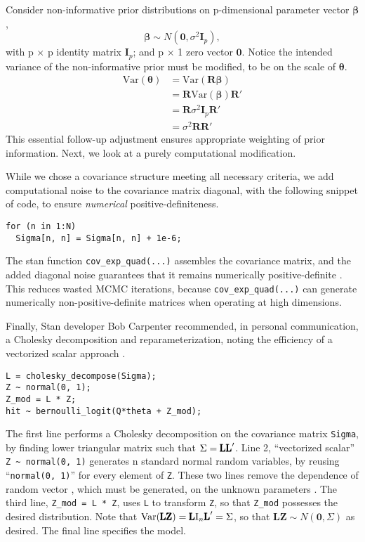 Consider non-informative prior distributions on p-dimensional parameter vector $\pmb{\beta}$,
\begin{equation}
\pmb{\beta} \sim N(\pmb{0}, \sigma^{2}\pmb{I}_{p}), 
\end{equation}
with p $\times$ p identity matrix $\pmb{I}_{p}$; and p $\times$ 1 zero vector $\pmb{0}$. Notice the intended variance of the non-informative prior must be modified, to be on the scale of $\pmb{\theta}$.
\begin{align}
\text{Var}(\pmb{\theta}) &= \text{Var}(\pmb{R \beta}) \\
&= \pmb{R}\text{Var}(\pmb{\beta})\pmb{R}' \\
&= \pmb{R}\sigma^{2}\pmb{I}_{p}\pmb{R}' \\
&= \sigma^{2} \pmb{R}\pmb{R}'
\end{align}
This essential follow-up adjustment ensures appropriate weighting of prior information. Next, we look at a purely computational modification.

While we chose a covariance structure meeting all necessary criteria, we add computational noise to the covariance matrix diagonal, with the following snippet of code, to ensure {\it numerical} positive-definiteness.
\begin{verbatim}
for (n in 1:N)
  Sigma[n, n] = Sigma[n, n] + 1e-6;
\end{verbatim}
The stan function \verb|cov_exp_quad(...)| assembles the covariance matrix, and the added diagonal noise guarantees that it remains numerically positive-definite \citep{Trangucci2017}. This reduces wasted MCMC iterations, because \verb|cov_exp_quad(...)| can generate numerically non-positive-definite matrices when operating at high dimensions.

Finally, Stan developer Bob Carpenter recommended, in personal communication, a Cholesky decomposition and reparameterization, noting the efficiency of a vectorized scalar approach \citep{Carpenter}.
\begin{verbatim}
L = cholesky_decompose(Sigma);  
Z ~ normal(0, 1);  
Z_mod = L * Z; 
hit ~ bernoulli_logit(Q*theta + Z_mod);
\end{verbatim}
The first line performs a Cholesky decomposition on the covariance matrix \verb|Sigma|, by finding lower triangular matrix  such that $\Sigma = \text{\pmb{LL}}'$. Line 2, ``vectorized scalar'' \verb|Z ~ normal(0, 1)| generates n standard normal random variables, by reusing ``\verb|normal(0, 1)|'' for every element of \verb|Z|. These two lines remove the dependence of random vector , which must be generated, on the unknown parameters \citep{Trangucci2017}. The third line, \verb|Z_mod = L * Z|, uses \verb|L| to transform \verb|Z|, so that \verb|Z_mod| possesses the desired distribution. Note that $\text{Var}(\text{\pmb{LZ}}) = \text{\pmb{L}} \text{I}_{n}\text{\pmb{L}}' = \Sigma$, so that $\pmb{LZ} \sim N(\pmb{0}, \Sigma)$ as desired. The final line specifies the model.

